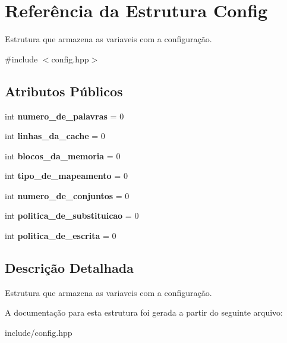 \hypertarget{structConfig}{}\section{Referência da Estrutura Config}
\label{structConfig}


Estrutura que armazena as variaveis com a configuração.  




{\ttfamily \#include $<$config.\+hpp$>$}

\subsection*{Atributos Públicos}
\begin{DoxyCompactItemize}
\item 
\mbox{\label{structConfig_a273a6f799964bd2ff319c569c9500935}} 
int {\bfseries numero\+\_\+de\+\_\+palavras} = 0
\item 
\mbox{\label{structConfig_a3423ef11393ff848a808694c900070f8}} 
int {\bfseries linhas\+\_\+da\+\_\+cache} = 0
\item 
\mbox{\label{structConfig_aa19f0f4753645de65b14ba990201f22b}} 
int {\bfseries blocos\+\_\+da\+\_\+memoria} = 0
\item 
\mbox{\label{structConfig_a8e7990d187cbbddcf07f8b7a7db0ba99}} 
int {\bfseries tipo\+\_\+de\+\_\+mapeamento} = 0
\item 
\mbox{\label{structConfig_ae1aea8983ec0444a3ead4fc7f62a8a59}} 
int {\bfseries numero\+\_\+de\+\_\+conjuntos} = 0
\item 
\mbox{\label{structConfig_a68f6443b26a6dbce3510c9410e89b33a}} 
int {\bfseries politica\+\_\+de\+\_\+substituicao} = 0
\item 
\mbox{\label{structConfig_a81dc627408d2a898503cf800339852b5}} 
int {\bfseries politica\+\_\+de\+\_\+escrita} = 0
\end{DoxyCompactItemize}


\subsection{Descrição Detalhada}
Estrutura que armazena as variaveis com a configuração. 

A documentação para esta estrutura foi gerada a partir do seguinte arquivo\+:\begin{DoxyCompactItemize}
\item 
include/config.\+hpp\end{DoxyCompactItemize}
